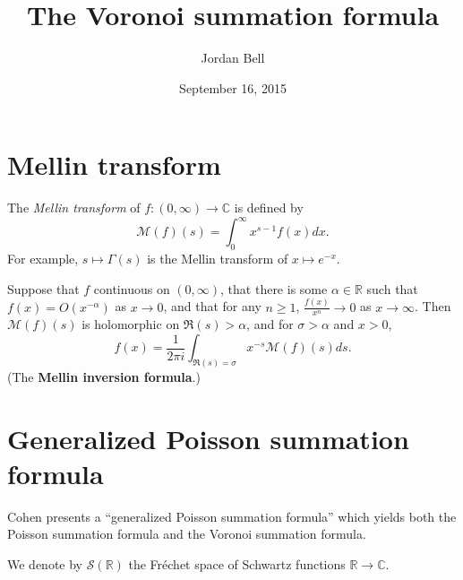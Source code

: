 \documentclass{article}
\begin{document}
\title{The Voronoi summation formula}
\author{Jordan Bell}
\date{September 16, 2015}

\maketitle




\section{Mellin transform}
The {\em Mellin transform} of $f:(0,\infty) \to \mathbb{C}$ is defined by
\[
\mathscr{M}(f)(s) = \int_0^\infty x^{s-1} f(x) dx.
\]
For example, $s \mapsto \Gamma(s)$ is the Mellin transform of $x \mapsto e^{-x}$.


Suppose that $f$ continuous on $(0,\infty)$, that  there is some $\alpha \in \mathbb{R}$ such that
$f(x)=O(x^{-\alpha})$ as $x \to 0$, and that for any $n \geq 1$, $\frac{f(x)}{x^n} \to 0$ as $x \to \infty$. 
Then \cite[p.~107, Proposition 9.7.7]{cohen}
$\mathscr{M}(f)(s)$ is holomorphic on $\Re(s)>\alpha$, and
for $\sigma>\alpha$ and $x>0$,
\[
f(x)=\frac{1}{2\pi i}\int_{\Re(s)=\sigma} x^{-s} \mathscr{M}(f)(s) ds.
\] 
(The \textbf{Mellin inversion formula}.)



\section{Generalized Poisson summation formula}
Cohen \cite[pp.~177--182, \S 10.2.5]{cohen} presents a ``generalized Poisson summation formula'' which yields both the Poisson summation formula and the Voronoi
summation formula.

We denote by $\mathscr{S}(\mathbb{R})$ the Fr\'echet space of Schwartz functions $\mathbb{R} \to \mathbb{C}$.
\end{document}
